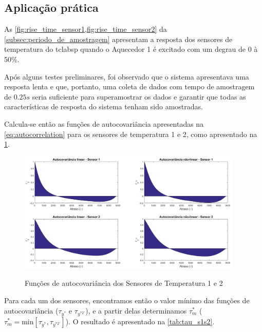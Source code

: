 \begin{apendicesenv}
\section{Aplicação prática}
\label{ch:using_sampling_time_with_autocorrelation}

As \cref{fig:rise_time_sensor1,fig:rise_time_sensor2} da \cref{subsec:periodo_de_amostragem}
apresentam a resposta dos sensores de temperatura do \acrshort{tclabsp} quando o Aquecedor 1 é
excitado com um degrau de 0 à 50\%.

Após alguns testes preliminares, foi observado que o sistema apresentava uma resposta lenta
e que, portanto, uma coleta de dados com tempo de amostragem de $0.25s$ seria suficiente para
superamostrar os dados e garantir que todas as características de resposta do sistema tenham
sido amostradas.

Calcula-se então as funções de autocovariância apresentadas na \cref{eq:autocorrelation} para os
sensores de temperatura 1 e 2, como apresentado na \cref{fig:autocorrelationS1S2}.

\begin{figure}[h]
	\caption{Funções de autocovariância dos Sensores de Temperatura 1 e 2}
	\begin{center}
		\includegraphics[width=0.95\textwidth]{./5_images/AutocorrelationS1S2.png} 
		\label{fig:autocorrelationS1S2}
	\end{center}
	\centering
\end{figure}

Para cada um dos sensores, encontramos então o valor mínimo das funções de autocovariância
($\tau_{y^{*}}$ e $\tau_{y^{*2'}}$), e a partir delas determinamos $\tau_m^*$
($\tau_{m}^{*} = \mathrm{min} \left[ \tau_{y^*} , \tau_{y^{*2'}} \right]$).
O resultado é apresentado na \cref{tab:tau_s1s2}.


\end{apendicesenv}
